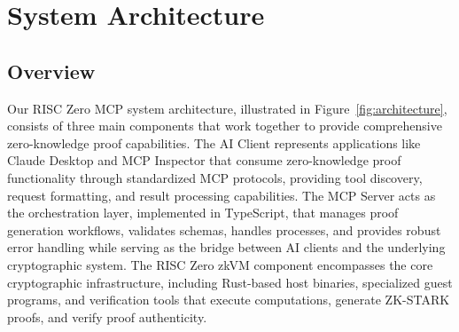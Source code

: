 \documentclass[11pt]{article}
\begin{document}
\section{System Architecture}
\label{sec:architecture}

\subsection{Overview}

Our RISC Zero MCP system architecture, illustrated in Figure~\ref{fig:architecture}, consists of three main components that work together to provide comprehensive zero-knowledge proof capabilities. The AI Client represents applications like Claude Desktop and MCP Inspector that consume zero-knowledge proof functionality through standardized MCP protocols, providing tool discovery, request formatting, and result processing capabilities. The MCP Server acts as the orchestration layer, implemented in TypeScript, that manages proof generation workflows, validates schemas, handles processes, and provides robust error handling while serving as the bridge between AI clients and the underlying cryptographic system. The RISC Zero zkVM component encompasses the core cryptographic infrastructure, including Rust-based host binaries, specialized guest programs, and verification tools that execute computations, generate ZK-STARK proofs, and verify proof authenticity.
\end{document}
